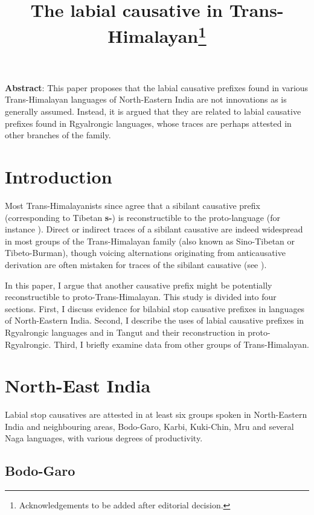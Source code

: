 \documentclass[oneside,a4paper,11pt]{article}
\newcommand{\ipa}[1]{\textbf{{\phon\mbox{#1}}}} %
\begin{document}
\title{The labial causative in Trans-Himalayan\footnote{Acknowledgements to be added after editorial decision.}}
\maketitle
\sloppy
\textbf{Abstract}: This paper proposes that the labial causative prefixes found in various Trans-Himalayan languages of North-Eastern India are not innovations as is generally assumed. Instead, it is argued that they are related to labial causative prefixes found in Rgyalrongic languages, whose traces are perhaps attested in other branches of the family.

\section{Introduction}
Most Trans-Himalayanists since \citet{conrady1896} agree that a sibilant causative prefix (corresponding to Tibetan \ipa{s-}) is reconstructible to the proto-language (for instance \citealt{wolfenden29outlines, matisoff03}). Direct or indirect traces of a sibilant causative are indeed widespread in most groups of the Trans-Himalayan family (also known as Sino-Tibetan or Tibeto-Burman), though voicing alternations originating from anticausative derivation are often mistaken for traces of the sibilant causative (see \citealt{jacques15causative}).

In this paper, I argue that another causative prefix might be potentially reconstructible to proto-Trans-Himalayan. This study is divided into four sections. First,  I discuss evidence for bilabial stop causative prefixes in languages of North-Eastern India. Second, I describe the uses of labial causative prefixes in Rgyalrongic languages and in Tangut and their reconstruction in proto-Rgyalrongic. Third, I briefly examine data from other groups of Trans-Himalayan.  

\section{North-East India}
Labial stop causatives are attested in at least six groups spoken in North-Eastern India and neighbouring areas, Bodo-Garo, Karbi, Kuki-Chin, Mru and several Naga languages, with various degrees of productivity.

\subsection{Bodo-Garo}
\end{document}
